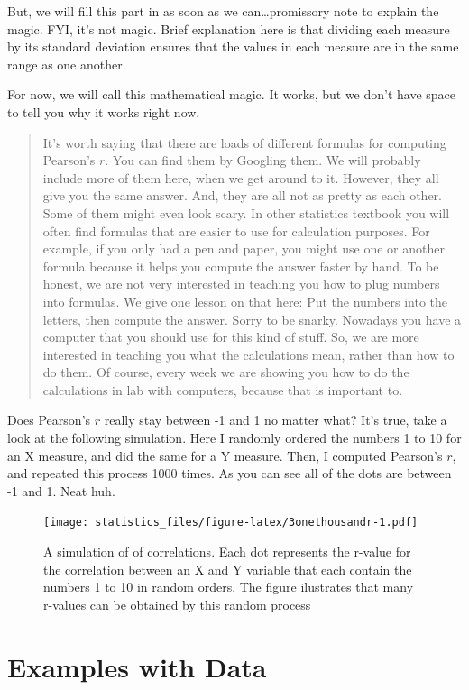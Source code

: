 \documentclass[]{book}
\begin{document}
But, we will fill this part in as soon as we can\ldots{}promissory note to explain the magic. FYI, it's not magic. Brief explanation here is that dividing each measure by its standard deviation ensures that the values in each measure are in the same range as one another.

For now, we will call this mathematical magic. It works, but we don't have space to tell you why it works right now.

\begin{quote}
It's worth saying that there are loads of different formulas for computing Pearson's \(r\). You can find them by Googling them. We will probably include more of them here, when we get around to it. However, they all give you the same answer. And, they are all not as pretty as each other. Some of them might even look scary. In other statistics textbook you will often find formulas that are easier to use for calculation purposes. For example, if you only had a pen and paper, you might use one or another formula because it helps you compute the answer faster by hand. To be honest, we are not very interested in teaching you how to plug numbers into formulas. We give one lesson on that here: Put the numbers into the letters, then compute the answer. Sorry to be snarky. Nowadays you have a computer that you should use for this kind of stuff. So, we are more interested in teaching you what the calculations mean, rather than how to do them. Of course, every week we are showing you how to do the calculations in lab with computers, because that is important to.
\end{quote}

Does Pearson's \(r\) really stay between -1 and 1 no matter what? It's true, take a look at the following simulation. Here I randomly ordered the numbers 1 to 10 for an X measure, and did the same for a Y measure. Then, I computed Pearson's \(r\), and repeated this process 1000 times. As you can see all of the dots are between -1 and 1. Neat huh.

\begin{figure}
\centering
\texttt{[image: statistics\_files/figure-latex/3onethousandr-1.pdf]}
\caption{\label{fig:3onethousandr}A simulation of of correlations. Each dot represents the r-value for the correlation between an X and Y variable that each contain the numbers 1 to 10 in random orders. The figure ilustrates that many r-values can be obtained by this random process}
\end{figure}

\hypertarget{examples-with-data}{%
\section{Examples with Data}\label{examples-with-data}}
\end{document}
